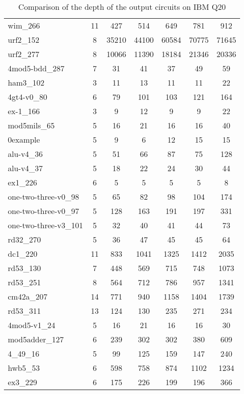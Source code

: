 \documentclass[journal]{IEEEtran}
\begin{document}
\begin{table*}[htbp]
\begin{center}
\begin{tabular}{|p{4.3cm}<{\centering}|c|c|c|c|c|c|}
				wim\_266 & 11 & 427 & 514 & 649 & 781 & 912 \\ 
				urf2\_152 & 8 & 35210 & 44100 & 60584 & 70775 & 71645 \\ 
				urf2\_277 & 8 & 10066 & 11390 & 18184 & 21346 & 20336 \\ 
				4mod5-bdd\_287 & 7 & 31 & 41 & 37 & 49 & 59 \\ 
				ham3\_102 & 3 & 11 & 13 & 11 & 11 & 22 \\ 
				4gt4-v0\_80 & 6 & 79 & 101 & 103 & 121 & 164 \\ 
				ex-1\_166 & 3 & 9 & 12 & 9 & 9 & 22 \\ 
				mod5mils\_65 & 5 & 16 & 21 & 16 & 16 & 40 \\ 
				0example & 5 & 9 & 6 & 12 & 15 & 15 \\ 
				alu-v4\_36 & 5 & 51 & 66 & 87 & 75 & 128 \\ 
				alu-v4\_37 & 5 & 18 & 22 & 24 & 30 & 44 \\ 
				ex1\_226 & 6 & 5 & 5 & 5 & 5 & 8 \\ 
				one-two-three-v0\_98 & 5 & 65 & 82 & 98 & 104 & 174 \\ 
				one-two-three-v0\_97 & 5 & 128 & 163 & 191 & 197 & 331 \\ 
				one-two-three-v3\_101 & 5 & 32 & 40 & 41 & 44 & 73 \\ 
				rd32\_270 & 5 & 36 & 47 & 45 & 45 & 64 \\
				dc1\_220 & 11 & 833 & 1041 & 1325 & 1412 & 2035 \\ 
				rd53\_130 & 7 & 448 & 569 & 715 & 748 & 1073 \\ 
				rd53\_251 & 8 & 564 & 712 & 786 & 957 & 1341 \\ 
				cm42a\_207 & 14 & 771 & 940 & 1158 & 1404 & 1739 \\ 
				rd53\_311 & 13 & 124 & 130 & 235 & 271 & 234 \\ 
				4mod5-v1\_24 & 5 & 16 & 21 & 16 & 16 & 30 \\ 
				mod5adder\_127 & 6 & 239 & 302 & 302 & 380 & 609 \\ 
				4\_49\_16 & 5 & 99 & 125 & 159 & 147 & 240 \\ 
				hwb5\_53 & 6 & 598 & 758 & 874 & 1102 & 1234 \\ 
				ex3\_229 & 6 & 175 & 226 & 199 & 196 & 366 \\ 
				\hline
			\end{tabular} 
		\end{center} 	
		\caption{Comparison of  the depth of the output circuits on  IBM Q20} 
		\label{tab6}
	\end{table*}
	
\end{document}
